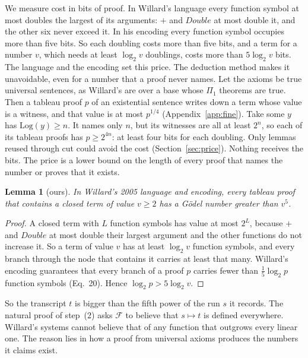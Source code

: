 \documentclass[11pt]{article}
\newcommand{\F}{\mathcal{F}}
\newcommand{\fs}[1]{\ifmmode\text{\guillemotleft#1\guillemotright}\else\guillemotleft#1\guillemotright\fi}
\theoremstyle{plain}
\newtheorem{lemma}[theorem]{Lemma}
\theoremstyle{definition}
\begin{document}
We measure cost in bits of proof. In Willard's language every function
symbol at most doubles the largest of its arguments: $+$ and
$\mathit{Double}$ at most double it, and the other six never exceed it. In
his encoding every function symbol occupies more than five bits. So each
doubling costs more than five bits, and a term for a number $v$, which needs
at least $\log_2 v$ doublings, costs more than $5\log_2 v$ bits. The
language and the encoding set this price. The deduction method makes it
unavoidable, even for a number that a proof never names. Let the axioms be
true universal sentences, as Willard's are over a base whose $\Pi_1$
theorems are true. Then a tableau proof $p$ of an existential sentence
writes down a term whose value is a witness, and that value is at most
$p^{1/4}$ (Appendix~\ref{app:fine}). Take
\fs{some $y$ has $\mathrm{Log}(y) \ge n$}. It names only $n$, but its
witnesses are all at least $2^n$, so each of its tableau proofs has
$p \ge 2^{4n}$: at least four bits for each doubling.
Only lemmas reused through cut could avoid the cost (Section~\ref{sec:price}).
Nothing receives the bits. The price is a lower bound on the length of every
proof that names the number or proves that it exists.

\begin{lemma}[ours]\label{lem:transcript}
In Willard's 2005 language and encoding, every tableau proof that contains a
closed term of value $v \ge 2$ has a Gödel number greater than $v^5$.
\end{lemma}

\begin{proof}
A closed term with $L$ function symbols has value at most $2^L$, because $+$
and $\mathit{Double}$ at most double their largest argument and the other
functions do not increase it. So a term of value $v$ has at least $\log_2 v$
function symbols, and every branch through the node that contains it
carries at least that many. Willard's encoding guarantees that every branch
of a proof $p$ carries fewer than $\tfrac15 \log_2 p$ function symbols
(Eq.~20). Hence $\log_2 p > 5 \log_2 v$.
\end{proof}

\noindent
So the transcript $t$ is bigger than the fifth power of the run $s$ it
records. The natural proof of step~(2) asks $\F$ to believe that
$s \mapsto t$ is defined everywhere. Willard's systems cannot believe that of
any function that outgrows every linear one. The reason lies in how a proof
from universal axioms produces the numbers it claims exist.
\end{document}
